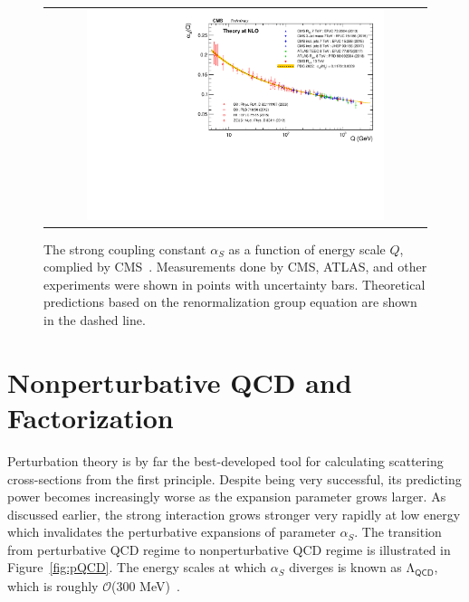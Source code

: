 \begin{figure}[tbh!]
 \begin{center}
 \begin{tabular}{c}
 \includegraphics[width=0.8\textwidth]{figures/Part1/QCD/alphaS}
 \end{tabular}
 \caption{The strong coupling constant $\alpha_{S}$ as a function of energy scale $Q$, complied by \ac{CMS}~\cite{cms:twiki}. Measurements done by \ac{CMS}, \ac{ATLAS}, and other experiments were shown in points with uncertainty bars. Theoretical predictions based on the renormalization group equation are shown in the dashed line.}
 \label{fig:alphaS}
 \end{center}
\end{figure}

\section{Nonperturbative QCD and Factorization}
\label{sec:npQCD}

Perturbation theory is by far the best-developed tool for calculating scattering cross-sections from the first principle. Despite being very successful, its predicting power becomes increasingly worse as the expansion parameter grows larger. As discussed earlier, the strong interaction grows stronger very rapidly at low energy which invalidates the perturbative expansions of parameter $\alpha_{S}$. The transition from perturbative \ac{QCD} regime to nonperturbative \ac{QCD} regime is illustrated in Figure~\ref{fig:pQCD}. The energy scales at which $\alpha_{S}$ diverges is known as $\mathrm{\Lambda}_{\textsf{QCD}}$, which is roughly $\mathcal{O}$(300 MeV)~\cite{Deur:2016tte}.


